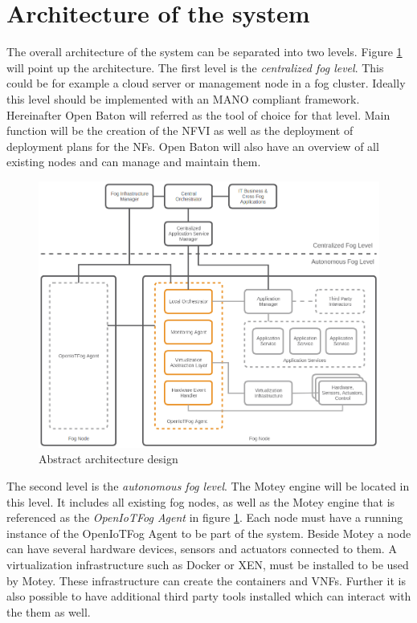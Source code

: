 \section{Architecture of the system}
The overall architecture of the system can be separated into two levels.
Figure \ref{fig:abstract_architecture_design} will point up the architecture.
The first level is the \textit{centralized fog level}.
This could be for example a cloud server or management node in a fog cluster.
Ideally this level should be implemented with an \ac{MANO} compliant framework.
Hereinafter Open Baton will referred as the tool of choice for that level.
Main function will be the creation of the \ac{NFVI} as well as the deployment of deployment plans for the \acp{NF}.
Open Baton will also have an overview of all existing nodes and can manage and maintain them.

\begin{figure}[H]
    \centering
    \includegraphics[width=\textwidth]{resources/images/initial_structure.png}
    \caption[Abstract architecture design]{Abstract architecture design}
    \label{fig:abstract_architecture_design}
\end{figure}

The second level is the \textit{autonomous fog level}.
The Motey engine will be located in this level.
It includes all existing fog nodes, as well as the Motey engine that is referenced as the \textit{OpenIoTFog Agent} in figure \ref{fig:abstract_architecture_design}.
Each node must have a running instance of the OpenIoTFog Agent to be part of the system.
Beside Motey a node can have several hardware devices, sensors and actuators connected to them.
A virtualization infrastructure such as Docker or XEN, must be installed to be used by Motey.
These infrastructure can create the containers and \acp{VNF}.
Further it is also possible to have additional third party tools installed which can interact with the them as well.

